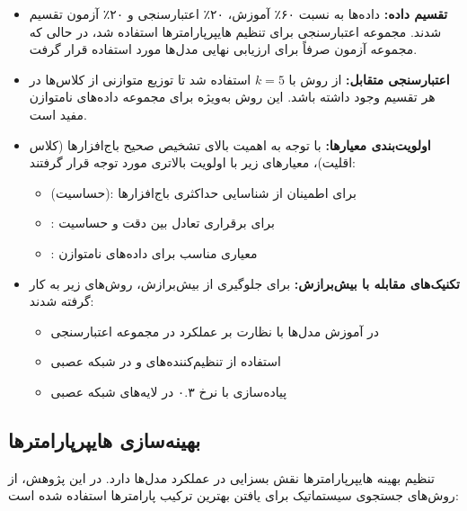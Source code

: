 \begin{itemize}
    \item \textbf{تقسیم داده:} داده‌ها به نسبت ۶۰٪ آموزش، ۲۰٪ اعتبارسنجی و ۲۰٪ آزمون تقسیم شدند. مجموعه اعتبارسنجی برای تنظیم هایپرپارامترها استفاده شد، در حالی که مجموعه آزمون صرفاً برای ارزیابی نهایی مدل‌ها مورد استفاده قرار گرفت.

    \item \textbf{اعتبارسنجی متقابل:} از روش  با $k=5$ استفاده شد تا توزیع متوازنی از کلاس‌ها در هر تقسیم وجود داشته باشد. این روش به‌ویژه برای مجموعه داده‌های نامتوازن مفید است.

    \item \textbf{اولویت‌بندی معیارها:} با توجه به اهمیت بالای تشخیص صحیح باج‌افزارها (کلاس اقلیت)، معیارهای زیر با اولویت بالاتری مورد توجه قرار گرفتند:
    \begin{itemize}
        \item {} (حساسیت): برای اطمینان از شناسایی حداکثری باج‌افزارها
        \item {}: برای برقراری تعادل بین دقت و حساسیت
        \item {}: معیاری مناسب برای داده‌های نامتوازن
    \end{itemize}

    \item \textbf{تکنیک‌های مقابله با بیش‌برازش:} برای جلوگیری از بیش‌برازش، روش‌های زیر به کار گرفته شدند:
    \begin{itemize}
        \item {} در آموزش مدل‌ها با نظارت بر عملکرد در مجموعه اعتبارسنجی
        \item استفاده از تنظیم‌کننده‌های  و  در شبکه عصبی
        \item پیاده‌سازی  با نرخ ۰.۳ در لایه‌های شبکه عصبی
    \end{itemize}
\end{itemize}

\subsection{بهینه‌سازی هایپرپارامترها}
تنظیم بهینه هایپرپارامترها نقش بسزایی در عملکرد مدل‌ها دارد. در این پژوهش، از روش‌های جستجوی سیستماتیک برای یافتن بهترین ترکیب پارامترها استفاده شده است:

